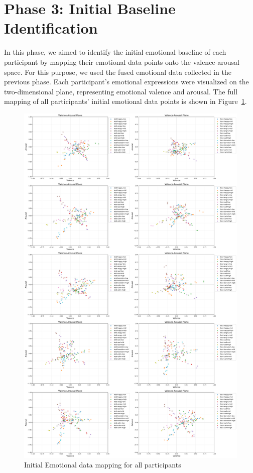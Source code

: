 \section{Phase 3: Initial Baseline Identification}
In this phase, we aimed to identify the initial emotional baseline of each participant by mapping their emotional data points onto the valence-arousal space. For this purpose, we used the fused emotional data collected in the previous phase. Each participant's emotional expressions were visualized on the two-dimensional plane, representing emotional valence and arousal. The full mapping of all participants' initial emotional data points is shown in Figure~\ref{fig:initial-mappings-grid}.

\begin{figure}[H]
    \centering
    \includegraphics[width=1\textwidth]{img/chapter_04/baseline/participant_initial_mapping.png}
    \caption{Initial Emotional data mapping for all participants}
    \label{fig:initial-mappings-grid}
\end{figure}

